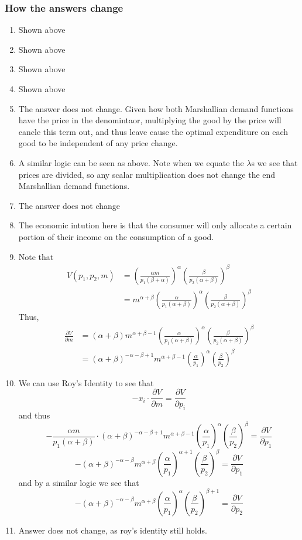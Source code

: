\documentclass[12pt]{article}
\begin{document}
\subsubsection*{How the answers change}
\begin{enumerate}[label=\alph*]
    \item Shown above 
    \item Shown above 
    \item Shown above
    \item Shown above
    \item The answer does not change. Given how both Marshallian demand functions have the price in the denomintaor, multiplying the good by the price will cancle this term out, and thus leave cause the optimal expenditure on each good to be independent of any price change. 
    \item A similar logic can be seen as above. Note when we equate the $\lambda$s we see that prices are divided, so any scalar multiplication does not change the end Marshallian demand functions. 
    \item The answer does not change
    \item The economic intution here is that the consumer will only allocate a certain portion of their income on the consumption of a good. 
    \item Note that 
    \begin{align*}
        V(p_1, p_2, m) &= \left( \frac{\alpha m}{p_1(\beta + \alpha)} \right)^{\alpha} \left( \frac{\beta}{p_2(\alpha + \beta)} \right)^\beta \\
        &= m^{\alpha + \beta} \left( \frac{\alpha}{p_1(\alpha + \beta)} \right)^\alpha \left( \frac{\beta}{p_2(\alpha + \beta)} \right)^\beta
    \end{align*}
    Thus, 
    \begin{align*}
        \frac{\partial V}{\partial m} &= (\alpha + \beta) m^{\alpha + \beta -1} \left( \frac{\alpha}{p_1(\alpha + \beta)} \right)^\alpha \left( \frac{\beta}{p_2(\alpha + \beta)} \right)^\beta\\
        &= (\alpha + \beta)^{-\alpha - \beta + 1} m^{\alpha + \beta -1} \left( \frac{\alpha}{p_1} \right)^\alpha \left( \frac{\beta}{p_2} \right)^\beta
    \end{align*}
    \item We can use Roy's Identity to see that 
    \[
        - x_i \cdot \frac{\partial V}{\partial m} = \frac{\partial V}{\partial p_i}
    \]
    and thus
    \[
    -\frac{\alpha m}{p_1(\alpha + \beta)} \cdot (\alpha + \beta)^{-\alpha - \beta + 1} m^{\alpha + \beta -1} \left( \frac{\alpha}{p_1} \right)^\alpha \left( \frac{\beta}{p_2} \right)^\beta = \frac{\partial V}{\partial p_1}
    \]
    \[
    -(\alpha + \beta)^{-\alpha - \beta} m^{\alpha + \beta} \left( \frac{\alpha}{p_1} \right)^{\alpha + 1} \left( \frac{\beta}{p_2} \right)^\beta = \frac{\partial V}{\partial p_1}
    \]
    and by a similar logic we see that
    \[
        -(\alpha + \beta)^{-\alpha - \beta} m^{\alpha + \beta} \left( \frac{\alpha}{p_1} \right)^{\alpha} \left( \frac{\beta}{p_2} \right)^{\beta + 1} = \frac{\partial V}{\partial p_2}
    \]
    \item Answer does not change, as roy's identity still holds. 
\end{enumerate}
\end{document}
